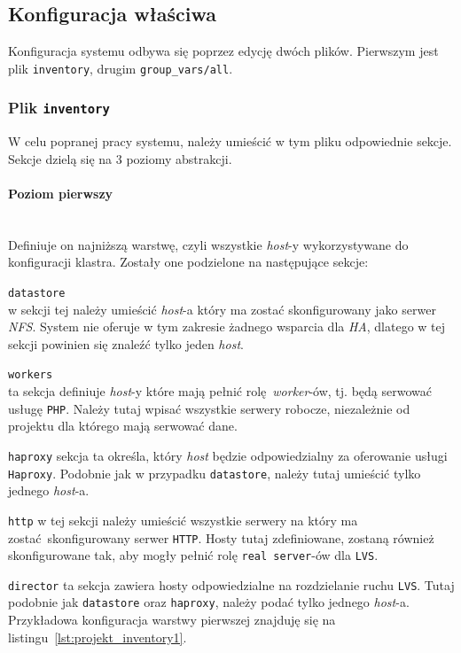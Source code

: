 \subsection{Konfiguracja właściwa}
Konfiguracja systemu odbywa się poprzez edycję dwóch plików.
Pierwszym jest plik \texttt{inventory}, drugim \texttt{group\_vars/all}.
\subsubsection{Plik \texttt{inventory}}
W celu popranej pracy systemu, należy umieścić w tym pliku odpowiednie sekcje.
Sekcje dzielą się na 3 poziomy abstrakcji.\\
\paragraph*{Poziom pierwszy}~\\
Definiuje on najniższą warstwę, czyli wszystkie \textit{host}-y wykorzystywane do konfiguracji klastra.
Zostały one podzielone na następujące sekcje:
\begin{description}
\item{\texttt{datastore}}\\
w sekcji tej należy umieścić \textit{host}-a który ma zostać skonfigurowany jako serwer \textit{NFS}.
System nie oferuje w tym zakresie żadnego wsparcia dla \textit{HA}, dlatego w tej sekcji powinien się znaleźć tylko jeden \textit{host}.
\item{\texttt{workers}}\\
ta sekcja definiuje \textit{host}-y które mają pełnić rolę \textit{worker}-ów, tj. będą serwować usługę \texttt{PHP}.
Należy tutaj wpisać wszystkie serwery robocze, niezależnie od projektu dla którego mają serwować dane.
\item{\texttt{haproxy}}
sekcja ta określa, który \textit{host} będzie odpowiedzialny za oferowanie usługi \texttt{Haproxy}.
Podobnie jak w przypadku \texttt{datastore}, należy tutaj umieścić tylko jednego \textit{host}-a.
\item{\texttt{http}}
w tej sekcji należy umieścić wszystkie serwery na który ma zostać skonfigurowany serwer \texttt{HTTP}.
Hosty tutaj zdefiniowane, zostaną również skonfigurowane tak, aby mogły pełnić rolę \texttt{real server}-ów dla \texttt{LVS}.
\item{\texttt{director}}
ta sekcja zawiera hosty odpowiedzialne na rozdzielanie ruchu \texttt{LVS}.
Tutaj podobnie jak \texttt{datastore} oraz \texttt{haproxy}, należy podać tylko jednego \textit{host}-a.
Przykładowa konfiguracja warstwy pierwszej znajduję się na listingu~\ref{lst:projekt_inventory1}.

\end{description}

